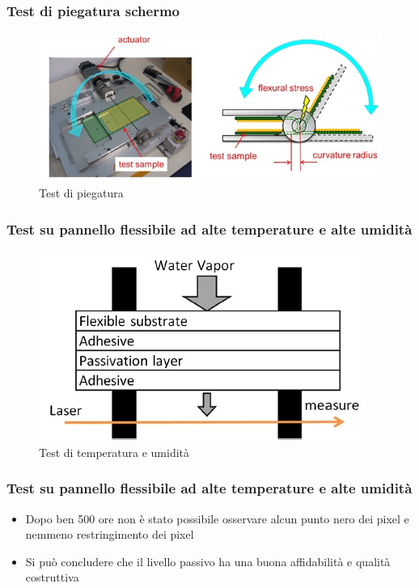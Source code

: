 \documentclass[12pt]{beamer}
\begin{document}
	\begin{frame}
		\frametitle{Test di piegatura schermo}
		\begin{figure}
			\centering
			\includegraphics[width=1\linewidth]{FISICA/test2}
			\caption{Test di piegatura}
			\label{fig:test2}
		\end{figure}
	\end{frame}
	\begin{frame}
		\frametitle{Test su pannello flessibile ad alte temperature e alte umidità}
		\begin{figure}
			\centering
			\includegraphics[width=1\linewidth]{FISICA/test_temp}
			\caption{Test di temperatura e umidità}
			\label{fig:testtemp}
		\end{figure}
	\end{frame}
	\begin{frame}
		\frametitle{Test su pannello flessibile ad alte temperature e alte umidità}
		\begin{itemize}
			\item Dopo ben 500 ore non è stato possibile osservare alcun punto nero dei pixel e nemmeno restringimento dei pixel
			\pause
			\item Si può concludere che il livello passivo ha una buona affidabilità e qualità costruttiva
		\end{itemize}
	\end{frame}
\end{document}
